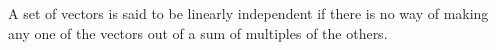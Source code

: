 A set of vectors is said to be linearly independent if there is no
way of making any one of the vectors out of a sum of multiples of
the others.